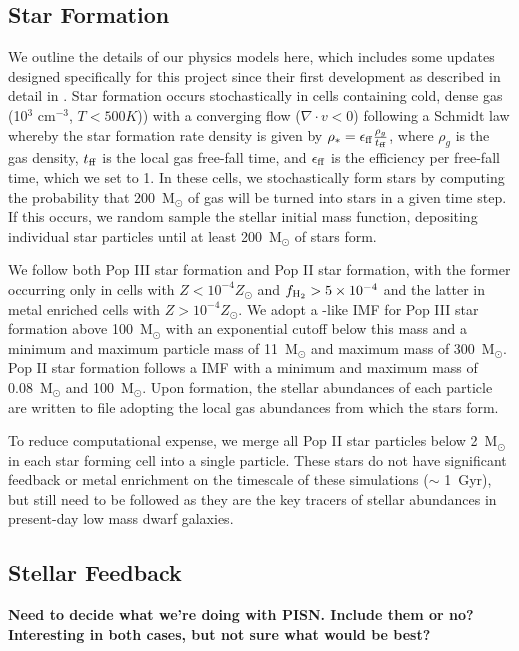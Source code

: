 \documentclass[12pt]{article} %
\begin{document}
\subsection{Star Formation}

We outline the details of our physics models here, which includes some updates designed specifically for this project since their first development as described in detail in \cite{Emerick2019a}. Star formation occurs stochastically in cells containing cold, dense gas (10$^3$ cm$^{-3}$, $T < 500 K$)) with a converging flow ($\nabla \cdot v < 0$) following a Schmidt law whereby the star formation rate density is given by $\rho_* = \epsilon_{\rm ff} \frac{\rho_g}{t_{\rm ff}}$, where $\rho_g$ is the gas density, $t_{\rm ff}$ is the local gas free-fall time, and $\epsilon_{\rm ff}$ is the efficiency per free-fall time, which we set to 1. In these cells, we stochastically form stars by computing the probability that 200~M$_{\odot}$ of gas will be turned into stars in a given time step. If this occurs, we random sample the stellar initial mass function, depositing individual star particles until at least 200~M$_{\odot}$ of stars form. 

We follow both Pop III star formation and Pop II star formation, with the former occurring only in cells with $Z < 10^{-4} Z_{\odot}$ and $f_{\rm H_2} > 5\times 10^{-4}$ and the latter in metal enriched cells with $Z > 10^{-4} Z_{\odot}$. We adopt a \cite{Salpeter1955}-like IMF for Pop III star formation  above 100~M$_{\odot}$ with an exponential cutoff below this mass and a minimum and maximum particle mass of 11~M$_{\odot}$ and maximum mass of 300~M$_{\odot}$. Pop II star formation follows a \cite{Kroupa2001} IMF with a minimum and maximum mass of 0.08~M$_{\odot}$ and 100~M$_{\odot}$. Upon formation, the stellar abundances of each particle are written to file adopting the local gas abundances from which the stars form.

To reduce computational expense, we merge all Pop II star particles below 2~M$_{\odot}$ in each star forming cell into a single particle. These stars do not have significant feedback or metal enrichment on the timescale of these simulations ($\sim$ 1~Gyr), but still need to be followed as they are the key tracers of stellar abundances in present-day low mass dwarf galaxies.

\subsection{Stellar Feedback}
\textbf{Need to decide what we're doing with PISN. Include them or no? Interesting in both cases, but not sure what would be best?}
\end{document}
